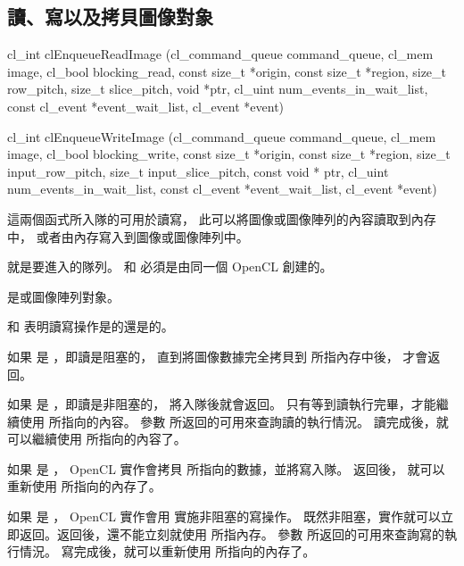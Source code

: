 \subsection{讀、寫以及拷貝圖像對象}



\startCLFUNC
cl_int clEnqueueReadImage (cl_command_queue command_queue,
			cl_mem image,
			cl_bool blocking_read,
			const size_t *origin,
			const size_t *region,
			size_t row_pitch,
			size_t slice_pitch,
			void *ptr,
			cl_uint num_events_in_wait_list,
			const cl_event *event_wait_list,
			cl_event *event)

cl_int clEnqueueWriteImage (cl_command_queue command_queue,
			cl_mem image,
			cl_bool blocking_write,
			const size_t *origin,
			const size_t *region,
			size_t input_row_pitch,
			size_t input_slice_pitch,
			const void * ptr,
			cl_uint num_events_in_wait_list,
			const cl_event *event_wait_list,
			cl_event *event)
\stopCLFUNC

這兩個函式所入隊的可用於讀寫，
此可以將圖像或圖像陣列的內容讀取到內存中，
或者由內存寫入到圖像或圖像陣列中。

 就是要進入的隊列。
 和  必須是由同一個 OpenCL 創建的。

 是或圖像陣列對象。

 和 
表明讀寫操作是{}的還是{}的。

如果  是 ，即讀是阻塞的，
直到將圖像數據完全拷貝到  所指內存中後，  才會返回。

如果  是 ，即讀是非阻塞的，
 將入隊後就會返回。
只有等到讀執行完畢，才能繼續使用  所指向的內容。
參數  所返回的可用來查詢讀的執行情況。
讀完成後，就可以繼續使用  所指向的內容了。

如果  是 ，
OpenCL 實作會拷貝  所指向的數據，並將寫入隊。
 返回後，
就可以重新使用  所指向的內存了。

如果  是 ，
OpenCL 實作會用  實施非阻塞的寫操作。
既然非阻塞，實作就可以立即返回。返回後，還不能立刻就使用  所指內存。
參數  所返回的可用來查詢寫的執行情況。
寫完成後，就可以重新使用  所指向的內存了。

